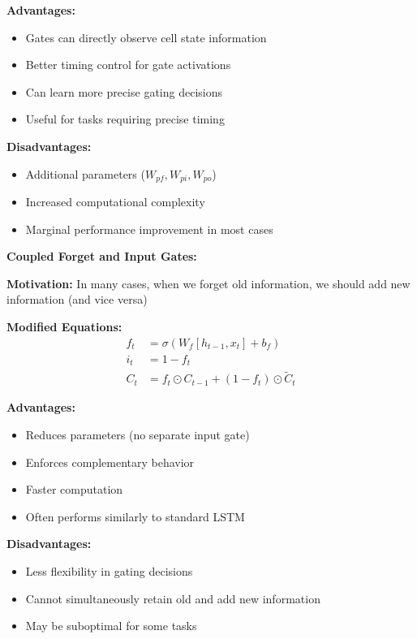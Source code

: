 \documentclass[12pt]{article}
\begin{document}
\begin{enumerate}[(a)]
{    \textbf{Advantages:}
    \begin{itemize}
        \item Gates can directly observe cell state information
        \item Better timing control for gate activations
        \item Can learn more precise gating decisions
        \item Useful for tasks requiring precise timing
    \end{itemize}
    
    \textbf{Disadvantages:}
    \begin{itemize}
        \item Additional parameters ($W_{pf}, W_{pi}, W_{po}$)
        \item Increased computational complexity
        \item Marginal performance improvement in most cases
    \end{itemize}
    
    \textbf{Coupled Forget and Input Gates:}
    
    \textbf{Motivation:} In many cases, when we forget old information, we should add new information (and vice versa)
    
    \textbf{Modified Equations:}
    \begin{align}
    f_t &= \sigma(W_f [h_{t-1}, x_t] + b_f) \\
    i_t &= 1 - f_t \\
    C_t &= f_t \odot C_{t-1} + (1-f_t) \odot \tilde{C}_t
    \end{align}
    
    \textbf{Advantages:}
    \begin{itemize}
        \item Reduces parameters (no separate input gate)
        \item Enforces complementary behavior
        \item Faster computation
        \item Often performs similarly to standard LSTM
    \end{itemize}
    
    \textbf{Disadvantages:}
    \begin{itemize}
        \item Less flexibility in gating decisions
        \item Cannot simultaneously retain old and add new information
        \item May be suboptimal for some tasks
    \end{itemize}
    
}
\end{enumerate}
\end{document}

